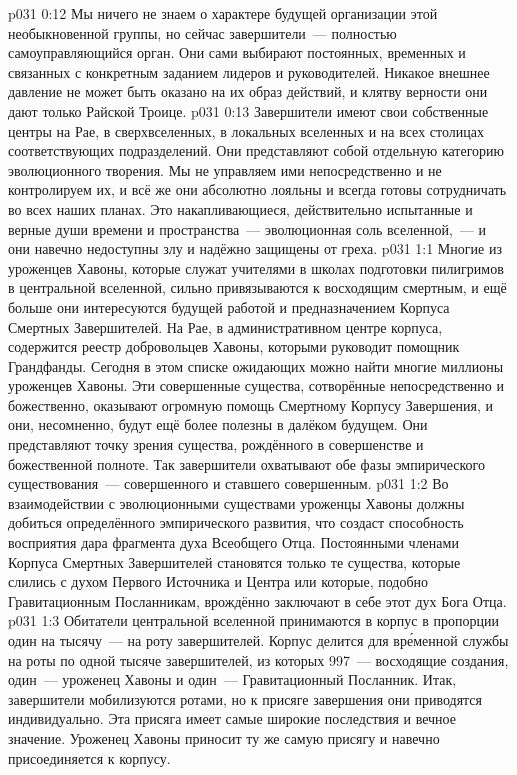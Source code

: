 \vs p031 0:12 Мы ничего не знаем о характере будущей организации этой необыкновенной группы, но сейчас завершители~--- полностью самоуправляющийся орган. Они сами выбирают постоянных, временных и связанных с конкретным заданием лидеров и руководителей. Никакое внешнее давление не может быть оказано на их образ действий, и клятву верности они дают только Райской Троице.
\vs p031 0:13 Завершители имеют свои собственные центры на Рае, в сверхвселенных, в локальных вселенных и на всех столицах соответствующих подразделений. Они представляют собой отдельную категорию эволюционного творения. Мы не управляем ими непосредственно и не контролируем их, и всё же они абсолютно лояльны и всегда готовы сотрудничать во всех наших планах. Это накапливающиеся, действительно испытанные и верные души времени и пространства~--- эволюционная соль вселенной,~--- и они навечно недоступны злу и надёжно защищены от греха.
\vs p031 1:1 Многие из уроженцев Хавоны, которые служат учителями в школах подготовки пилигримов в центральной вселенной, сильно привязываются к восходящим смертным, и ещё больше они интересуются будущей работой и предназначением Корпуса Смертных Завершителей. На Рае, в административном центре корпуса, содержится реестр добровольцев Хавоны, которыми руководит помощник Грандфанды. Сегодня в этом списке ожидающих можно найти многие миллионы уроженцев Хавоны. Эти совершенные существа, сотворённые непосредственно и божественно, оказывают огромную помощь Смертному Корпусу Завершения, и они, несомненно, будут ещё более полезны в далёком будущем. Они представляют точку зрения существа, рождённого в совершенстве и божественной полноте. Так завершители охватывают обе фазы эмпирического существования~--- совершенного и ставшего совершенным.
\vs p031 1:2 Во взаимодействии с эволюционными существами уроженцы Хавоны должны добиться определённого эмпирического развития, что создаст способность восприятия дара фрагмента духа Всеобщего Отца. Постоянными членами Корпуса Смертных Завершителей становятся только те существа, которые слились с духом Первого Источника и Центра или которые, подобно Гравитационным Посланникам, врождённо заключают в себе этот дух Бога Отца.
\vs p031 1:3 Обитатели центральной вселенной принимаются в корпус в пропорции один на тысячу~--- на роту завершителей. Корпус делится для вр\'еменной службы на роты по одной тысяче завершителей, из которых 997~--- восходящие создания, один~--- уроженец Хавоны и один~--- Гравитационный Посланник. Итак, завершители мобилизуются ротами, но к присяге завершения они приводятся индивидуально. Эта присяга имеет самые широкие последствия и вечное значение. Уроженец Хавоны приносит ту же самую присягу и навечно присоединяется к корпусу.
